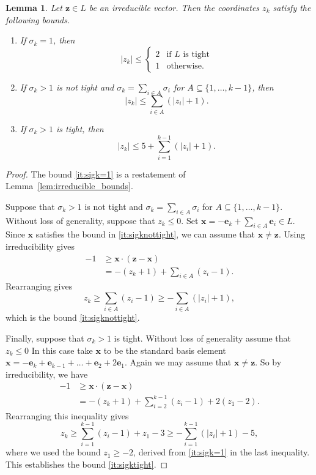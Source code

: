\documentclass{amsart} %
\newcommand{\e}{\bm{e}}
\theoremstyle{thm}
\newtheorem{lem}[Theorem]{Lemma}
\theoremstyle{definition}
\numberwithin{equation}{section}
\begin{document}
\begin{lem}\label{lem:irreducible_bounds2}
Let $\bm{z}\in L$ be an irreducible vector. Then the coordinates $z_k$ satisfy the following bounds.
\begin{enumerate}[label = (\roman*)]
    \item\label{it:sigk=1} If $\sigma_k=1$, then 
    \[|z_k|\leq 
    \begin{cases}
    2 &\text{if $L$ is tight}\\
    1 &\text{otherwise.}
    \end{cases}
    \]
    \item\label{it:sigknottight} If $\sigma_k>1$ is not tight and $\sigma_k=\sum_{i\in A} \sigma_i$ for $A \subseteq \{1, \dots, k-1\}$, then
    \[|z_k|\leq \sum_{i \in A}(|z_i| +1).
    \]
    \item\label{it:sigktight} If $\sigma_k>1$ is tight, then
    \[|z_k|\leq 5+ \sum_{i =1}^{k-1}(|z_i| +1).
    \]
\end{enumerate}
\end{lem}
\begin{proof}
The bound \ref{it:sigk=1} is a restatement of Lemma~\ref{lem:irreducible_bounds}.

Suppose that $\sigma_k>1$ is not tight and $\sigma_k=\sum_{i\in A} \sigma_i$ for $A \subseteq \{1, \dots, k-1\}$. Without loss of generality, suppose that $z_k\leq 0$. Set $\bm{x}=-\e_k + \sum_{i\in A}\e_i \in L$. Since $\bm{x}$ satisfies the bound in \ref{it:sigknottight}, we can assume that $\bm{x}\neq \bm{z}$. Using irreducibility gives
\begin{align*}
    -1&\geq \bm{x}\cdot(\bm{z}-\bm{x})\\
    &=-(z_k+1)+ \sum_{i \in A}(z_i -1).
\end{align*}
Rearranging gives
\[
z_k\geq \sum_{i \in A}(z_i -1)\geq -\sum_{i \in A}(|z_i| +1),
\]
which is the bound \ref{it:sigknottight}.

Finally, suppose that $\sigma_k>1$ is tight. Without loss of generality assume that $z_k\leq 0$ In this case take $\bm{x}$ to be the standard basis element $\bm{x}= -\e_k +\e_{k-1}+ \dots + \e_2 + 2\e_1$. Again we may assume that $\bm{x}\neq \bm{z}$. So by irreducibility, we have 
\begin{align*}
    -1&\geq \bm{x}\cdot(\bm{z}-\bm{x})\\
    &=-(z_k+1)+ \sum_{i=2}^{k-1}(z_i -1) + 2(z_1-2).
\end{align*}
Rearranging this inequality gives
\[
z_k \geq \sum_{i=1}^{k-1}(z_i -1) + z_1-3\geq -\sum_{i=1}^{k-1}(|z_i| +1) -5,
\]
where we used the bound $z_1\geq -2$, derived from \ref{it:sigk=1} in the last inequality. This establishes the bound \ref{it:sigktight}.
\end{proof}
\end{document}
